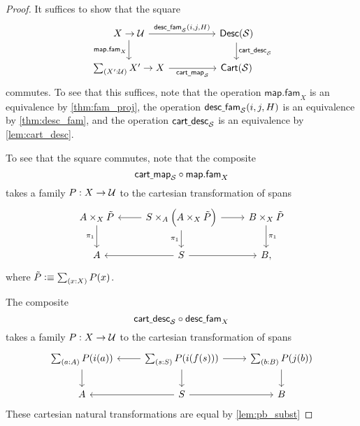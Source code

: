 \begin{proof}
It suffices to show that the square
\begin{equation*}
\begin{tikzcd}[column sep=huge]
X\to \UU \arrow[r,"{\mathsf{desc\usc{}fam}_{\mathcal{S}}(i,j,H)}"] \arrow[d,swap,"\mathsf{map.fam}_X"] & \mathsf{Desc}(\mathcal{S}) \arrow[d,"\mathsf{cart\usc{}desc}_{\mathcal{S}}"] \\
\sm{X':\UU}X'\to X \arrow[r,swap,"\mathsf{cart\usc{}map}_{\mathcal{S}}"] & \mathsf{Cart}(\mathcal{S})
\end{tikzcd}
\end{equation*}
commutes. To see that this suffices, note that the operation $\mathsf{map.fam}_X$ is an equivalence by \cref{thm:fam_proj}, the operation $\mathsf{desc\underline{\ }{}fam}_{\mathcal{S}}(i,j,H)$ is an equivalence by \cref{thm:desc_fam}, and the operation $\mathsf{cart\underline{\ }{}desc}_{\mathcal{S}}$ is an equivalence by \cref{lem:cart_desc}.

To see that the square commutes, note that the composite
\begin{equation*}
\mathsf{cart\underline{\ }{}map}_{\mathcal{S}}\circ \mathsf{map.fam}_X
\end{equation*}
takes a family $P:X\to \mathcal{U}$ to the cartesian transformation of spans
\begin{equation*}
\begin{tikzcd}
A\times_X\tilde{P} \arrow[d,swap,"\pi_1"] & S\times_A\Big(A\times_X\tilde{P}\Big) \arrow[l] \arrow[r] \arrow[d,swap,"\pi_1"] & B\times_X\tilde{P} \arrow[d,"\pi_1"] \\
A & S \arrow[l] \arrow[r] & B,
\end{tikzcd}
\end{equation*}
where $\tilde{P}\defeq\sm{x:X}P(x)$.

The composite 
\begin{equation*}
\mathsf{cart\underline{\ }{}desc}_{\mathcal{S}}\circ \mathsf{desc\underline{\ }{}fam}_X
\end{equation*}
takes a family $P:X\to \mathcal{U}$ to the cartesian transformation of spans
\begin{equation*}
\begin{tikzcd}
\sm{a:A}P(i(a)) \arrow[d] & \sm{s:S}P(i(f(s))) \arrow[l] \arrow[r] \arrow[d] & \sm{b:B}P(j(b)) \arrow[d] \\
A & S \arrow[l] \arrow[r] & B
\end{tikzcd}
\end{equation*}
These cartesian natural transformations are equal by \cref{lem:pb_subst}
\end{proof}

